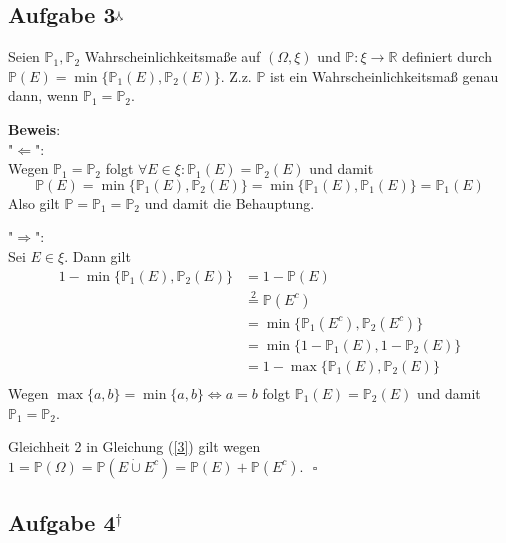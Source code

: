 \documentclass[11pt,a4paper,ngerman]{article}
\newcommand{\set}[1]{ \{ #1 \}}
\newcommand{\Prob}{\mathbb{P}}
\begin{document}
\subsection*{Aufgabe 3$^\curlywedgedownarrow$}
Seien $\Prob_1, \Prob_2$ Wahrscheinlichkeitsmaße auf $(\Omega, \xi)$ und $\Prob: \xi \to \mathbb{R}$ definiert durch $\Prob(E) = \min \set{\Prob_1(E), \Prob_2(E)}$. Z.z. $\Prob$ ist ein Wahrscheinlichkeitsmaß genau dann, wenn $\Prob_1 = \Prob_2$.

\textbf{Beweis}: \\
"$\Leftarrow$": \\
Wegen $\Prob_1 = \Prob_2$ folgt $\forall E \in \xi: \Prob_1(E) = \Prob_2(E)$ und damit
\begin{equation}
\Prob(E) = \min \set{\Prob_1(E), \Prob_2(E)} = \min \set{\Prob_1(E), \Prob_1(E)} = \Prob_1(E)
\end{equation}
Also gilt $\Prob = \Prob_1 = \Prob_2$ und damit die Behauptung.

"$\Rightarrow$": \\
Sei $E \in \xi$. Dann gilt
\begin{equation}\label{3}\begin{split}
1-\min \set{\Prob_1(E),\Prob_2(E)}
&= 1- \Prob(E) \\
&\stackrel{2}{=} \Prob(E^c)\\
&= \min \set{\Prob_1(E^c),\Prob_2(E^c)} \\
&= \min \set{1-\Prob_1(E),1-\Prob_2(E)} \\
&= 1- \max \set{\Prob_1(E),\Prob_2(E)} \\
\end{split}\end{equation}
Wegen $\max \set{a,b} = \min \set{a,b} \Leftrightarrow a = b$ folgt
$\Prob_1(E) = \Prob_2(E)$ und damit $\Prob_1 = \Prob_2$.

Gleichheit 2 in Gleichung (\ref{3}) gilt wegen $1 = \Prob(\Omega) = \Prob(E \dot{\cup} E^c) = \Prob(E) + \Prob(E^c)$.
$\mbox{}$ \hfill $\square$
\subsection*{Aufgabe 4$^\dagger$}


\label{LastPage}
\end{document}
